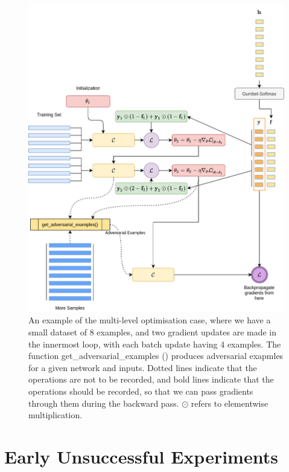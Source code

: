 \documentclass{ociamthesis}
\begin{document}
\begin{figure}
    \centering
    \includegraphics[scale=0.17]{biplot.png}
    \caption{An example of the multi-level optimisation case, where we have a
    small dataset of 8 examples, and two gradient updates are made in the
    innermost loop, with each batch update having 4 examples. The function
    get\_adversarial\_examples () produces adversarial exapmles for a given
    network and inputs. Dotted lines indicate that the operations are not to be
    recorded, and bold lines indicate that the operations should be recorded, so
    that we can pass gradients through them during the backward pass. $\odot$
    refers to elementwise multiplication.}
    \label{fig:bilevel-opt}
\end{figure}

\chapter{Early Unsuccessful Experiments}
\label{chapter:failed-exp}
\end{document}

